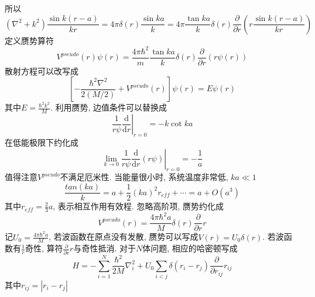 \documentclass[a4paper,11pt]{article}
\begin{document}
所以
\begin{equation*}
  (\nabla^2+k^2)\frac{\sin{k(r-a)}}{kr}=4\pi\delta(r)\frac{\sin{ka}}{k}=4\pi\frac{\tan ka}{k}\delta(r)\frac{\partial}{\partial r}\left(r\frac{\sin k(r-a)}{kr}\right)
\end{equation*}
定义赝势算符
\begin{equation*}
  V^{pseudo}(r)\psi(r)=\frac{4\pi\hbar^2}{m}\frac{\tan{ka}}{k}\delta(r)\frac{\partial}{\partial r}(r\psi(r))
\end{equation*}
散射方程可以改写成
\begin{equation*}
  \left[-\frac{\hbar^2\nabla^2}{2(M/2)}+V^{pseudo}(r)\right]\psi(r)=E\psi(r)
\end{equation*}
其中$E=\frac{\hbar^2k^2}{M}$. 利用赝势, 边值条件可以替换成
\begin{equation*}
  \left.\frac{1}{r\psi}\frac{\mathrm{d}}{\mathrm{d}r}\right|_{r=0}=-k\cot{ka}
\end{equation*}
在低能极限下约化成
\begin{equation*}
  \left.\lim_{k\to0}\frac{1}{r\psi}\frac{\mathrm{d}}{\mathrm{d}r}(r\psi)\right|_{r=0}=-\frac{1}{a}
\end{equation*}
值得注意$V^{pseudo}$不满足厄米性. 当能量很小时, 系统温度非常低, $ka\ll1$
\begin{equation*}
  \frac{tan(ka)}{k}=a+\frac{1}{2}(ka)^2r_{eff}+\cdots=a+O(a^3)
\end{equation*}
其中$r_{eff}=\frac{2}{3}a$, 表示相互作用有效程. 忽略高阶项, 赝势约化成
\begin{equation*}
  V^{pseudo}(r)=\frac{4\pi\hbar^2a}{M}\delta(r)\frac{\partial}{\partial r}r
\end{equation*}
记$U_0=\frac{4\pi\hbar^2a}{M}$, 若波函数在原点没有发散, 赝势可以写成$V(r)=U_0\delta(r)$. 若波函数有$\frac{1}{r}$奇性, 算符$\frac{\partial}{\partial r} r$与奇性抵消. 对于$N$体问题, 相应的哈密顿写成
\begin{equation*}
  H=-\sum_{i=1}^{N}\frac{\hbar^2}{2M}\nabla_i^2+U_0\sum_{i<j}\delta(r_i-r_j)\frac{\partial}{\partial r_{ij}}r_{ij}
\end{equation*}
其中$r_{ij}=|r_i-r_j|$
\end{document}
